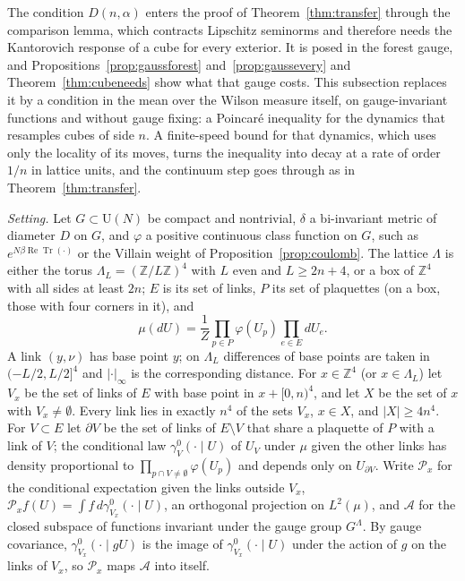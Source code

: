 \documentclass[aps,prd,twocolumn,superscriptaddress,nofootinbib,longbibliography,floatfix,amsmath,amssymb,10pt]{revtex4-2}
\theoremstyle{definition}
\theoremstyle{remark}
\newcommand{\Z}{\mathbb{Z}}
\newcommand{\U}{\mathrm{U}}
\newcommand{\ReTr}{\operatorname{Re}\operatorname{Tr}}
\begin{document}
The condition $D(n,\alpha)$ enters the proof of Theorem~\ref{thm:transfer}
through the comparison lemma, which contracts Lipschitz seminorms and
therefore needs the Kantorovich response of a cube for every exterior. It
is posed in the forest gauge, and Propositions~\ref{prop:gaussforest}
and~\ref{prop:gaussevery} and Theorem~\ref{thm:cubeneeds} show what that
gauge costs. This subsection replaces it by a condition in the mean over
the Wilson measure itself, on gauge-invariant functions and without gauge
fixing: a Poincar\'e inequality for the dynamics that resamples cubes of
side $n$. A finite-speed bound for that dynamics, which uses only the
locality of its moves, turns the inequality into decay at a rate of order
$1/n$ in lattice units, and the continuum step goes through as in
Theorem~\ref{thm:transfer}.

\emph{Setting.} Let $G\subset\U(N)$ be compact and nontrivial, $\delta$ a
bi-invariant metric of diameter $D$ on $G$, and $\varphi$ a positive
continuous class function on $G$, such as $e^{N\beta\ReTr(\cdot)}$ or the
Villain weight of Proposition~\ref{prop:coulomb}. The lattice $\Lambda$ is
either the torus $\Lambda_L=(\Z/L\Z)^4$ with $L$ even and $L\ge2n+4$, or a
box of $\Z^4$ with all sides at least $2n$; $E$ is its set of links, $P$ its
set of plaquettes (on a box, those with four corners in it), and
\[
\mu(dU)=\frac1Z\prod_{p\in P}\varphi(U_p)\prod_{e\in E}dU_e .
\]
A link $(y,\nu)$ has base point $y$; on $\Lambda_L$ differences of base
points are taken in $(-L/2,L/2]^4$ and $\lvert\cdot\rvert_\infty$ is the
corresponding distance. For $x\in\Z^4$ (or $x\in\Lambda_L$) let $V_x$ be the
set of links of $E$ with base point in $x+[0,n)^4$, and let $X$ be the set
of $x$ with $V_x\ne\emptyset$. Every link lies in exactly $n^4$ of the sets
$V_x$, $x\in X$, and $\lvert X\rvert\ge4n^4$. For $V\subset E$ let $\partial
V$ be the set of links of $E\setminus V$ that share a plaquette of $P$ with
a link of $V$; the conditional law $\gamma^0_V(\cdot\mid U)$ of $U_V$ under
$\mu$ given the other links has density proportional to $\prod_{p\cap V\ne
\emptyset}\varphi(U_p)$ and depends only on $U_{\partial V}$. Write
$\mathcal P_x$ for the conditional expectation given the links outside
$V_x$, $\mathcal P_xf(U)=\int f\,d\gamma^0_{V_x}(\cdot\mid U)$, an orthogonal
projection on $L^2(\mu)$, and $\mathcal A$ for the closed subspace of
functions invariant under the gauge group $G^\Lambda$. By gauge covariance,
$\gamma^0_{V_x}(\cdot\mid gU)$ is the image of $\gamma^0_{V_x}(\cdot\mid U)$
under the action of $g$ on the links of $V_x$, so $\mathcal P_x$ maps
$\mathcal A$ into itself.
\end{document}
